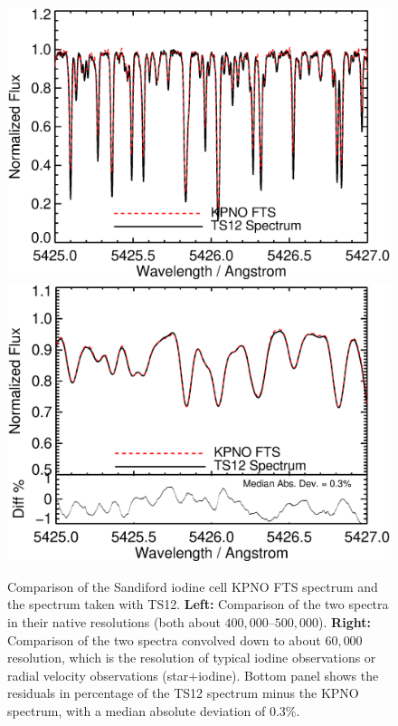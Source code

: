 \begin{figure}[!th]
\includegraphics[angle=0.,scale=0.33]{het/chunk_5425A_original_sclrem.eps}
\includegraphics[angle=0.,scale=0.33]{het/chunk_5425A_60k_gaus_sclrem_diff.eps}
\caption{Comparison of the Sandiford iodine cell KPNO FTS spectrum and
  the spectrum taken with TS12. \textbf{Left:} Comparison of the two
  spectra in their native resolutions (both about
  $400,000$--$500,000$). \textbf{Right:} Comparison of the two spectra
  convolved down to about $60,000$ resolution, which is the resolution
  of typical iodine observations or radial velocity observations
  (star$+$iodine). Bottom panel shows the residuals in percentage of
  the TS12 spectrum minus the KPNO spectrum, with a median absolute
  deviation of 0.3\%.
  \label{fig:ts12}}
\end{figure}


